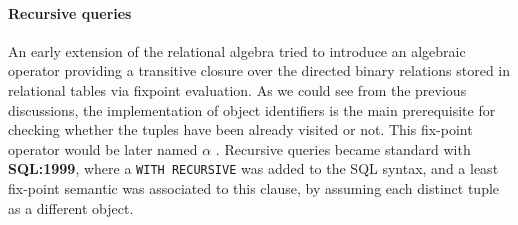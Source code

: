 
\paragraph*{Recursive queries}
An early extension of the relational algebra \cite{AhoAlpha} tried to introduce an algebraic operator providing a transitive closure over the directed binary relations stored in relational tables via fixpoint evaluation. As we could see from the previous discussions, the implementation of object identifiers is the main prerequisite for checking whether the tuples have been already visited or not. This fix-point operator would be later named $\alpha$ \cite{Alpha}. Recursive queries became standard with  \textbf{SQL:1999}, where a \texttt{WITH RECURSIVE} was added to the SQL syntax, and a least fix-point semantic was associated to this clause, by assuming each distinct tuple as a different object.

